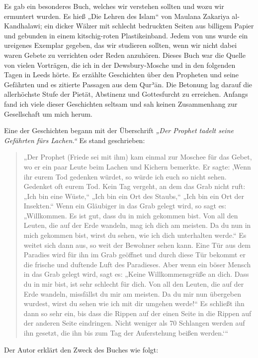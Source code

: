 \documentclass[12pt]{memoir}
\def\´{ʾ} %
\def \Quran{Qur\-\´ān} %
\def\–{\hskip0pt-\hskip0pt}
\begin{document}
Es gab ein besonderes Buch, welches wir verstehen sollten
und wozu wir ermuntert wurden.
Es hieß „Die Lehren des Islam“ von Maulana Zakariya al\–Kandhalawi;
ein dicker Wälzer mit schlecht bedruckten Seiten aus billigem Papier
und gebunden in einem kitschig-roten Plastikeinband.
Jedem von uns wurde ein ureigenes Exemplar gegeben, das wir studieren sollten,
wenn wir nicht dabei waren Gebete zu verrichten oder Reden anzuhören.
Dieses Buch war die Quelle von vielen Vorträgen,
die ich in der Dewsbury-Mosche und in den folgenden Tagen in Leeds hörte.
Es erzählte Geschichten über den Propheten und seine Gefährten
und es zitierte Passagen aus dem \Quran.
Die Betonung lag darauf die allerhöchste Stufe der Pietät,
Abstinenz und Gottesfurcht zu erreichen.
Anfangs fand ich viele dieser Geschichten seltsam
und sah keinen Zusammenhang zur Gesellschaft um mich herum.

Eine der Geschichten begann mit der Überschrift
\emph{„Der Prophet tadelt seine Gefährten fürs Lachen.“}
Es stand geschrieben:

\begin{quote}
„Der Prophet (Friede sei mit ihm) kam einmal zur Moschee für das Gebet,
wo er ein paar Leute beim Lachen und Kichern bemerkte.
Er sagte: ‚Wenn ihr eurem Tod gedenken würdet,
so würde ich euch so nicht sehen.
Gedenket oft eurem Tod. Kein Tag vergeht, an dem das Grab nicht ruft:
„Ich bin eine Wüste,“ „Ich bin ein Ort des Staubs,“
„Ich bin ein Ort der Insekten.“
Wenn ein Gläubiger in das Grab gelegt wird, so sagt es:
„Willkommen. Es ist gut, dass du in mich gekommen bist.
Von all den Leuten, die auf der Erde wandeln, mag ich dich am meisten.
Da du nun in mich gekommen bist, wirst du sehen,
wie ich dich unterhalten werde.“
Es weitet sich dann aus, so weit der Bewohner sehen kann.
Eine Tür aus dem Paradies wird für ihn im Grab geöffnet
und durch diese Tür bekommt er die frische und duftende Luft des Paradieses.
Aber wenn ein böser Mensch in das Grab gelegt wird, sagt es:
„Keine Willkommensgrüße an dich. Dass du in mir bist,
ist sehr schlecht für dich. Von all den Leuten, die auf der Erde wandeln,
missfällst du mir am meisten.
Da du mir nun übergeben wurdest,
wirst du sehen wie ich mit dir umgehen werde!“
Es schließt ihn dann so sehr ein,
bis dass die Rippen auf der einen Seite
in die Rippen auf der anderen Seite eindringen.
Nicht weniger als 70 Schlangen werden auf ihn gesetzt,
die ihn bis zum Tag der Auferstehung beißen werden.‘“
\end{quote}

Der Autor erklärt den Zweck des Buches wie folgt:
\end{document}
